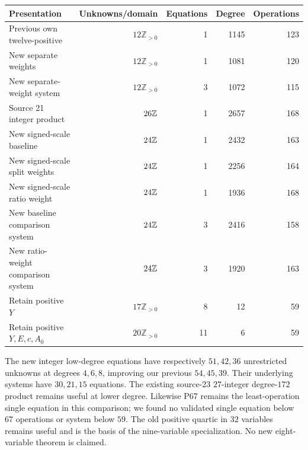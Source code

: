 \documentclass[11pt]{article}
\newcommand{\PP}{\mathbb Z_{>0}}
\begin{document}
\begin{center}\small
\begin{tabular}{@{}lrrrr@{}}\toprule
Presentation & Unknowns/domain & Equations & Degree & Operations\\\midrule
Previous own twelve-positive & $12\PP$ &1&1145&123\\
New separate weights & $12\PP$ &1&1081&120\\
New separate-weight system & $12\PP$ &3&1072&115\\
Source 21 integer product & $26\mathbb Z$ &1&2657&168\\
New signed-scale baseline & $24\mathbb Z$ &1&2432&163\\
New signed-scale split weights & $24\mathbb Z$ &1&2256&164\\
New signed-scale ratio weight & $24\mathbb Z$ &1&1936&168\\
New baseline comparison system & $24\mathbb Z$ &3&2416&158\\
New ratio-weight comparison system & $24\mathbb Z$ &3&1920&163\\
Retain positive $Y$ & $17\PP$ &8&12&59\\
Retain positive $Y,E,c,A_0$ & $20\PP$ &11&6&59\\\bottomrule
\end{tabular}
\end{center}
The new integer low-degree equations have respectively $51,42,36$ unrestricted
unknowns at degrees $4,6,8$, improving our previous $54,45,39$. Their underlying
systems have $30,21,15$ equations. The existing source-23 $27$-integer
degree-$172$ product remains useful at lower degree. Likewise P67 remains
the least-operation single equation in this comparison; we found no validated
single equation below $67$ operations or system below $59$. The old positive
quartic in $32$ variables remains useful and is the basis of the nine-variable
specialization. No new eight-variable theorem is claimed.
\end{document}

